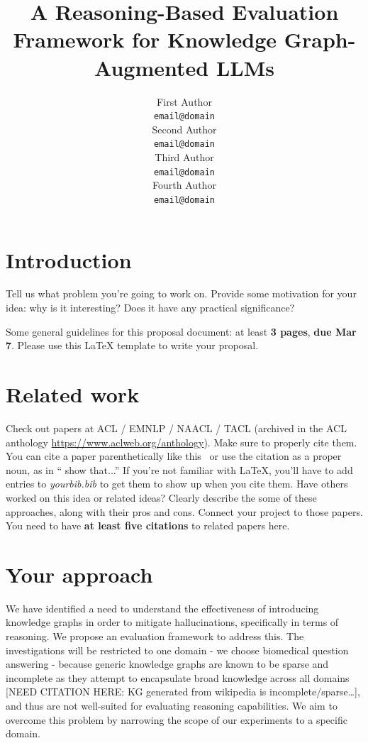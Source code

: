 \documentclass[11pt,a4paper]{article}
\title{A Reasoning-Based Evaluation Framework for Knowledge Graph-Augmented LLMs}
\author{First Author \\
  {\tt email@domain} \\\And
  Second Author \\
  {\tt email@domain} \\\And
  Third Author \\
  {\tt email@domain} \\\And
  Fourth Author \\
  {\tt email@domain} \\}
\date{}
\begin{document}
\maketitle

\section{Introduction}
Tell us what problem you're going to work on. Provide some motivation for your idea: why is it interesting? Does it have any practical significance? 

Some general guidelines for this proposal document: at least \textbf{3 pages}, \textbf{due Mar 7}. Please use this LaTeX template to write your proposal.

\section{Related work}

Check out papers at ACL / EMNLP / NAACL / TACL (archived in the ACL anthology \url{https://www.aclweb.org/anthology}). Make sure to properly cite them. You can cite a paper parenthetically like this~\cite{andrew2007scalable} or use the citation as a proper noun, as in `` show that...'' If you're not familiar with LaTeX, you'll have to add entries to \emph{yourbib.bib} to get them to show up when you cite them. 
Have others worked on this idea or related ideas? Clearly describe the some of these approaches, along with their pros and cons. Connect your project to those papers. You need to have \textbf{at least five citations} to related papers here. 

\section{Your approach}
We have identified a need to understand the effectiveness of introducing knowledge graphs in order to mitigate hallucinations, specifically in terms of reasoning. We propose an evaluation framework to address this. The investigations will be restricted to one domain - we choose biomedical question answering - because generic knowledge graphs are known to be sparse and incomplete as they attempt to encapsulate broad knowledge across all domains [NEED CITATION HERE: KG generated from wikipedia is incomplete/sparse…], and thus are not well-suited for evaluating reasoning capabilities. We aim to overcome this problem by narrowing the scope of our experiments to a specific domain.
\end{document}
